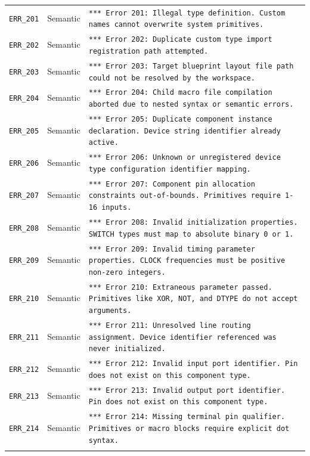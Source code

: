 \documentclass[10pt,a4paper]{article}
\begin{document}
\begin{longtable}{llp{8.2cm}}
\texttt{ERR\_201} & Semantic & \texttt{*** Error 201: Illegal type definition. Custom names cannot overwrite system primitives.} \\ \addlinespace
\texttt{ERR\_202} & Semantic & \texttt{*** Error 202: Duplicate custom type import registration path attempted.} \\ \addlinespace
\texttt{ERR\_203} & Semantic & \texttt{*** Error 203: Target blueprint layout file path could not be resolved by the workspace.} \\ \addlinespace
\texttt{ERR\_204} & Semantic & \texttt{*** Error 204: Child macro file compilation aborted due to nested syntax or semantic errors.} \\ \addlinespace
\texttt{ERR\_205} & Semantic & \texttt{*** Error 205: Duplicate component instance declaration. Device string identifier already active.} \\ \addlinespace
\texttt{ERR\_206} & Semantic & \texttt{*** Error 206: Unknown or unregistered device type configuration identifier mapping.} \\ \addlinespace
\texttt{ERR\_207} & Semantic & \texttt{*** Error 207: Component pin allocation constraints out-of-bounds. Primitives require 1-16 inputs.} \\ \addlinespace
\texttt{ERR\_208} & Semantic & \texttt{*** Error 208: Invalid initialization properties. SWITCH types must map to absolute binary 0 or 1.} \\ \addlinespace
\texttt{ERR\_209} & Semantic & \texttt{*** Error 209: Invalid timing parameter properties. CLOCK frequencies must be positive non-zero integers.} \\ \addlinespace
\texttt{ERR\_210} & Semantic & \texttt{*** Error 210: Extraneous parameter passed. Primitives like XOR, NOT, and DTYPE do not accept arguments.} \\ \addlinespace
\texttt{ERR\_211} & Semantic & \texttt{*** Error 211: Unresolved line routing assignment. Device identifier referenced was never initialized.} \\ \addlinespace
\texttt{ERR\_212} & Semantic & \texttt{*** Error 212: Invalid input port identifier. Pin does not exist on this component type.} \\ \addlinespace
\texttt{ERR\_213} & Semantic & \texttt{*** Error 213: Invalid output port identifier. Pin does not exist on this component type.} \\ \addlinespace
\texttt{ERR\_214} & Semantic & \texttt{*** Error 214: Missing terminal pin qualifier. Primitives or macro blocks require explicit dot syntax.} \\ \addlinespace

\end{longtable}
\end{document}
